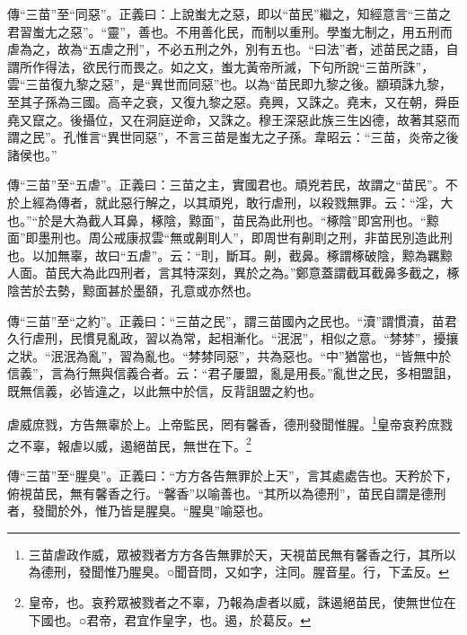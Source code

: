 {\noindent\zhuan{}\fzbyks 傳“三苗”至“同惡”。正義曰：上說蚩尢之惡，即以“苗民”繼之，知經意言“三苗之君習蚩尢之惡”。“靈”，善也。不用善化民，而制以重刑。學蚩尢制之，用五刑而虐為之，故為“五虐之刑”，不必五刑之外，別有五也。“曰法”者，述苗民之語，自謂所作得法，欲民行而畏之。如之文，蚩尢黃帝所滅，下句所說“三苗所誅”，雲“三苗復九黎之惡”，是“異世而同惡”也。以為“苗民即九黎之後。顓頊誅九黎，至其子孫為三國。高辛之衰，又復九黎之惡。堯興，又誅之。堯末，又在朝，舜臣堯又竄之。後攝位，又在洞庭逆命，又誅之。穆王深惡此族三生凶德，故著其惡而謂之民”。孔惟言“異世同惡”，不言三苗是蚩尢之子孫。韋昭云：“三苗，炎帝之後諸侯也。” \par}

{\noindent\zhuan{}\fzbyks 傳“三苗”至“五虐”。正義曰：三苗之主，實國君也。頑兇若民，故謂之“苗民”。不於上經為傳者，就此惡行解之，以其頑兇，敢行虐刑，以殺戮無罪。云：“淫，大也。”“於是大為截人耳鼻，椓陰，黥面”，苗民為此刑也。“椓陰”即宮刑也。“黥面”即墨刑也。周公戒康叔雲“無或劓刵人”，即周世有劓刵之刑，非苗民別造此刑也。以加無辜，故曰“五虐”。云：“刵，斷耳。劓，截鼻。椓謂椓破陰，黥為羈黥人面。苗民大為此四刑者，言其特深刻，異於之為。”鄭意蓋謂截耳截鼻多截之，椓陰苦於去勢，黥面甚於墨頟，孔意或亦然也。 \par}

{\noindent\zhuan{}\fzbyks 傳“三苗”至“之約”。正義曰：“三苗之民”，謂三苗國內之民也。“瀆”謂慣瀆，苗君久行虐刑，民慣見亂政，習以為常，起相漸化。“泯泯”，相似之意。“棼棼”，擾攘之狀。“泯泯為亂”，習為亂也。“棼棼同惡”，共為惡也。“中”猶當也，“皆無中於信義”，言為行無與信義合者。云：“君子屢盟，亂是用長。”亂世之民，多相盟詛，既無信義，必皆違之，以此無中於信，反背詛盟之約也。 \par}

虐威庶戮，方告無辜於上。上帝監民，罔有馨香，德刑發聞惟腥。\footnote{三苗虐政作威，眾被戮者方方各告無罪於天，天視苗民無有馨香之行，其所以為德刑，發聞惟乃腥臭。○聞音問，又如字，注同。腥音星。行，下孟反。}皇帝哀矜庶戮之不辜，報虐以威，遏絕苗民，無世在下。\footnote{皇帝，也。哀矜眾被戮者之不辜，乃報為虐者以威，誅遏絕苗民，使無世位在下國也。○君帝，君宜作皇字，也。遏，於葛反。}

{\noindent\zhuan{}\fzbyks 傳“三苗”至“腥臭”。正義曰：“方方各告無罪於上天”，言其處處告也。天矜於下，俯視苗民，無有馨香之行。“馨香”以喻善也。“其所以為德刑”，苗民自謂是德刑者，發聞於外，惟乃皆是腥臭。“腥臭”喻惡也。 \par}


